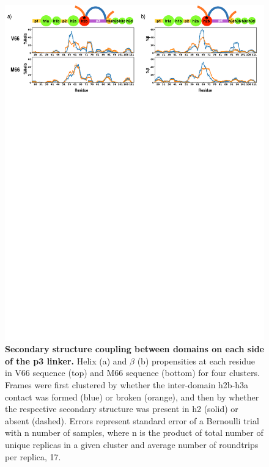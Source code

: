 \documentclass[10pt,letterpaper]{article}
\begin{document}
\begin{figure}[!ht]
\includegraphics[scale=0.5,width=\textwidth,trim={0 0cm 0 0cm},clip]{../figures/fig6.pdf}
\caption{{\bf Secondary structure coupling between domains on each side of the p3 linker.} Helix (a) and $\beta$ (b) propensities at each residue in V66 sequence (top) and M66 sequence (bottom) for four clusters. Frames were first clustered by whether the inter-domain h2b-h3a contact was formed (blue) or broken (orange), and then by whether the respective secondary structure was present in h2 (solid) or absent (dashed). Errors represent standard error of a Bernoulli trial with n number of samples, where n is the product of total number of unique replicas in a given cluster and average number of roundtrips per replica, 17.
 }
\label{fig6}
\end{figure}
\end{document}

